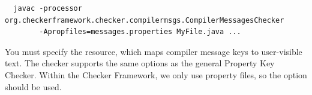\begin{Verbatim}
  javac -processor org.checkerframework.checker.compilermsgs.CompilerMessagesChecker
        -Apropfiles=messages.properties MyFile.java ...
\end{Verbatim}

You must specify the resource, which maps compiler message keys to user-visible
text.  The checker supports the same options as the general Property Key Checker.
Within the Checker Framework, we only use property files,
so the  option should be used.

